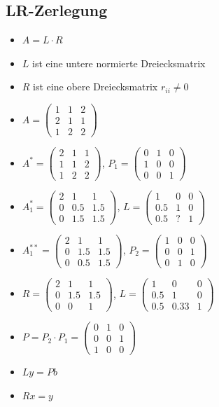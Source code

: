 \documentclass[8pt,a4paper]{scrartcl}
\begin{document}
\begin{multicols*}{3}
		\subsection{LR-Zerlegung}	
			\begin{itemize}\itemsep0pt				
				\item $A = L \cdot R$
				\item $L$ ist eine untere normierte Dreiecksmatrix
				\item $R$ ist eine obere Dreiecksmatrix $r_{ii} \neq 0$
				\item $A=\begin{pmatrix}1&1&2\\2&1&1\\1&2&2\end{pmatrix}$
				\item  $A^{*}=\begin{pmatrix}2&1&1\\1&1&2\\1&2&2\end{pmatrix}$, $P_{1}=\begin{pmatrix}0&1&0\\1&0&0\\0&0&1\end{pmatrix}$
				\item $A_{1}^{*}=\begin{pmatrix}2&1&1\\0&0.5&1.5\\0&1.5&1.5\end{pmatrix}$, $L=\begin{pmatrix}1&0&0\\0.5&1&0\\0.5&?&1\end{pmatrix}$
				\item $A_{1}^{**}=\begin{pmatrix}2&1&1\\0&1.5&1.5\\0&0.5&1.5\end{pmatrix}$, $P_{2}=\begin{pmatrix}1&0&0\\0&0&1\\0&1&0\end{pmatrix}$
				\item $R=\begin{pmatrix}2&1&1\\0&1.5&1.5\\0&0&1\end{pmatrix}$, $L=\begin{pmatrix}1&0&0\\0.5&1&0\\0.5&0.33&1\end{pmatrix}$
				\item 	$P = P_{2} \cdot P_{1} = \begin{pmatrix}0&1&0\\0&0&1\\1&0&0\end{pmatrix}$
				\item $Ly = Pb$
				\item $Rx = y$
			\end{itemize}
			

\end{multicols*}
\end{document}
